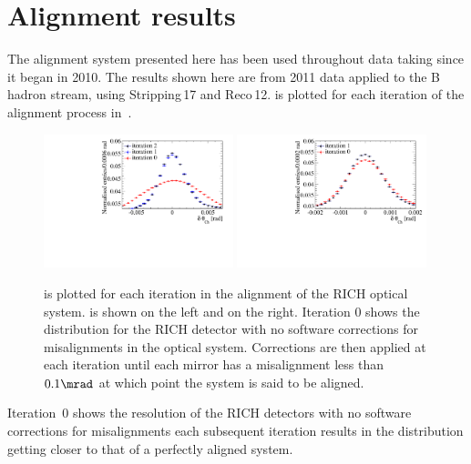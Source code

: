 \section{Alignment results}
\label{sec:AlignmentResults}

The alignment system presented here has been used throughout \lhcb data taking
since it began in 2010. The results shown here are from 2011 data applied to the
B\,hadron stream, using Stripping\,17 and Reco\,12. \deltatheta is plotted for
each iteration of the alignment process in~.
\begin{figure}[hbtp]
  \vspace*{-0.5\baselineskip}
  \centering
  \includegraphics[width=0.49\textwidth]{figs/Results/RICH1_Alignment_2011.pdf}
  \includegraphics[width=0.49\textwidth]{figs/Results/RICH2_Alignment_2011.pdf}
  \vspace*{-0.9\baselineskip}
  \caption{
    \deltatheta is plotted for each iteration in the alignment of the \lhcb RICH
    optical system. \richone is shown on the left and \richtwo on the right. 
    Iteration 0 shows the \deltatheta distribution for the RICH detector with no
    software corrections for misalignments in the optical system. Corrections
    are then applied at each iteration until each mirror has a misalignment less
    than $0.1\mrad$ at which point the system is said to be aligned.}
  \label{fig:RICHresolutionResults}
  \vspace*{-0.5\baselineskip}
\end{figure}
Iteration~0 shows the resolution of the RICH detectors with no software
corrections for misalignments each subsequent iteration results in the
distribution getting closer to that of a perfectly aligned system.

